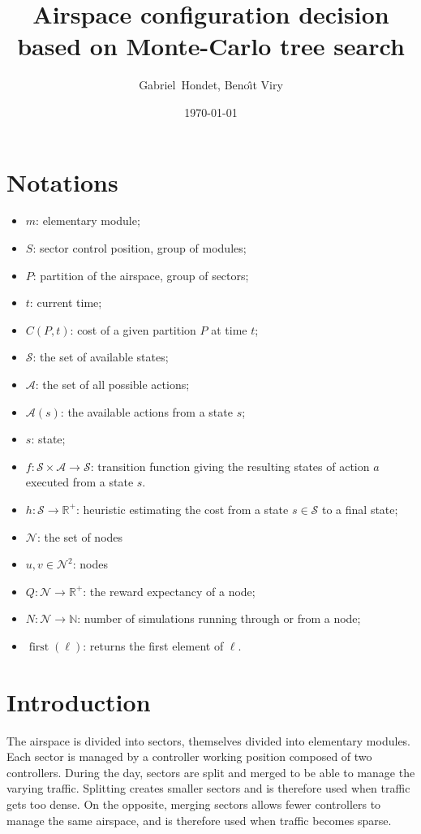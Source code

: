 \documentclass[twoside,twocolumn]{article}
\title{Airspace configuration decision based on Monte-Carlo tree search}
\author{Gabriel~Hondet, Beno\^{\i}t Viry}
\date{\today}
\DeclareMathOperator{\first}{first}
\begin{document}
\maketitle

\section*{Notations}
\begin{itemize}
  \item $m$: elementary module;
  \item $S$: sector control position, group of modules;
  \item $P$: partition of the airspace, group of sectors;
  \item $t$: current time;
  \item $C(P, t)$: cost of a given partition $P$ at time $t$;
  \item \(\mathcal{S}\): the set of available states;
  \item \(\mathcal{A}\): the set of all possible actions;
  \item \(\mathcal{A}(s)\): the available actions from a state \(s\);
  \item $s$: state;
  \item \(f \colon \mathcal{S} \times \mathcal{A} \to \mathcal{S}\):
    transition function giving the resulting states of action \(a\) executed
    from a state \(s\).
  \item $h \colon \mathcal{S} \to \mathbb{R}^+$: heuristic estimating the cost
    from a state \(s \in \mathcal{S}\) to a final state;
  \item \(\mathcal{N}\): the set of nodes
  \item \(u, v \in \mathcal{N}^2\): nodes
  \item \(Q \colon \mathcal{N} \to \mathbb{R}^+\): the reward expectancy of a
    node;
  \item \(N \colon \mathcal{N} \to \mathbb{N}\): number of simulations running
    through or from a node;
  \item \(\first(\ell)\): returns the first element of \(\ell\).
\end{itemize}

\section{Introduction}
The airspace is divided into sectors, themselves divided into elementary
modules. Each sector is managed by a controller working position composed of two
controllers.
During the day, sectors are split and merged to be able to
manage the varying traffic. Splitting creates smaller sectors and is therefore
used when traffic gets too dense. On the opposite, merging sectors allows fewer
controllers to manage the same airspace, and is therefore used when traffic
becomes sparse.
\end{document}
